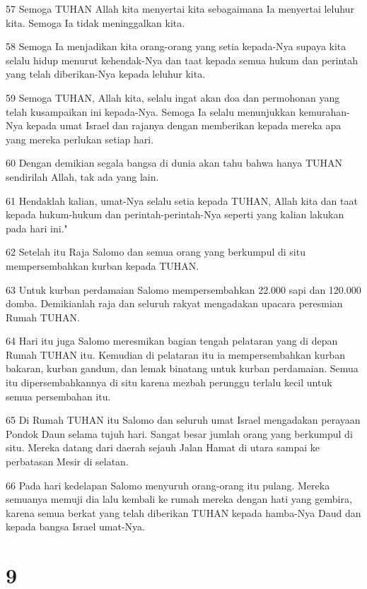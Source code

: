 \par 57 Semoga TUHAN Allah kita menyertai kita sebagaimana Ia menyertai leluhur kita. Semoga Ia tidak meninggalkan kita.
\par 58 Semoga Ia menjadikan kita orang-orang yang setia kepada-Nya supaya kita selalu hidup menurut kehendak-Nya dan taat kepada semua hukum dan perintah yang telah diberikan-Nya kepada leluhur kita.
\par 59 Semoga TUHAN, Allah kita, selalu ingat akan doa dan permohonan yang telah kusampaikan ini kepada-Nya. Semoga Ia selalu menunjukkan kemurahan-Nya kepada umat Israel dan rajanya dengan memberikan kepada mereka apa yang mereka perlukan setiap hari.
\par 60 Dengan demikian segala bangsa di dunia akan tahu bahwa hanya TUHAN sendirilah Allah, tak ada yang lain.
\par 61 Hendaklah kalian, umat-Nya selalu setia kepada TUHAN, Allah kita dan taat kepada hukum-hukum dan perintah-perintah-Nya seperti yang kalian lakukan pada hari ini."
\par 62 Setelah itu Raja Salomo dan semua orang yang berkumpul di situ mempersembahkan kurban kepada TUHAN.
\par 63 Untuk kurban perdamaian Salomo mempersembahkan 22.000 sapi dan 120.000 domba. Demikianlah raja dan seluruh rakyat mengadakan upacara peresmian Rumah TUHAN.
\par 64 Hari itu juga Salomo meresmikan bagian tengah pelataran yang di depan Rumah TUHAN itu. Kemudian di pelataran itu ia mempersembahkan kurban bakaran, kurban gandum, dan lemak binatang untuk kurban perdamaian. Semua itu dipersembahkannya di situ karena mezbah perunggu terlalu kecil untuk semua persembahan itu.
\par 65 Di Rumah TUHAN itu Salomo dan seluruh umat Israel mengadakan perayaan Pondok Daun selama tujuh hari. Sangat besar jumlah orang yang berkumpul di situ. Mereka datang dari daerah sejauh Jalan Hamat di utara sampai ke perbatasan Mesir di selatan.
\par 66 Pada hari kedelapan Salomo menyuruh orang-orang itu pulang. Mereka semuanya memuji dia lalu kembali ke rumah mereka dengan hati yang gembira, karena semua berkat yang telah diberikan TUHAN kepada hamba-Nya Daud dan kepada bangsa Israel umat-Nya.

\chapter{9}

